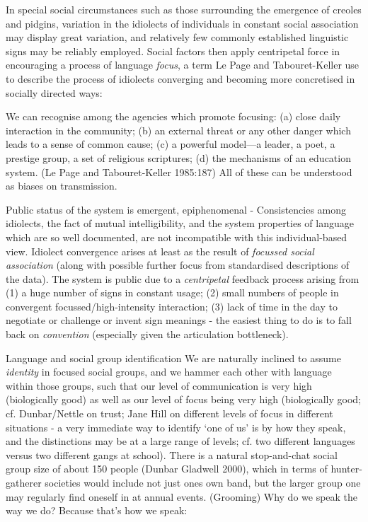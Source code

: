In special social circumstances such as those surrounding the emergence of creoles and pidgins, variation in the idiolects of individuals in constant social association may display great variation, and relatively few commonly established linguistic signs may be reliably employed. Social factors then apply centripetal force in encouraging a process of language \textit{focus}, a term Le Page and Tabouret-Keller use to describe the process of idiolects converging and becoming more concretised in socially directed ways:

We can recognise among the agencies which promote focusing: (a) close daily interaction in the community; (b) an external threat or any other danger which leads to a sense of common cause; (c) a powerful model---a leader, a poet, a prestige group, a set of religious scriptures; (d) the mechanisms of an education system. (Le Page and Tabouret-Keller 1985:187) All of these can be understood as biases on transmission.

Public status of the system is emergent, epiphenomenal - Consistencies among idiolects, the fact of mutual intelligibility, and the system properties of language which are so well documented, are not incompatible with this individual-based view. Idiolect convergence arises at least as the result of \textit{focussed social association} (along with possible further focus from standardised descriptions of the data). The system is public due to a \textit{centripetal} feedback process arising from (1) a huge number of signs in constant usage; (2) small numbers of people in convergent focussed/high-intensity interaction; (3) lack of time in the day to negotiate or challenge or invent sign meanings - the easiest thing to do is to fall back on \textit{convention} (especially given the articulation bottleneck).

Language and social group identification
We are naturally inclined to assume \textit{identity }in focused social groups, and we hammer each other with language within those groups, such that our level of communication is very high (biologically good) as well as our level of focus being very high (biologically good; cf. Dunbar/Nettle on trust; Jane Hill on different levels of focus in different situations - a very immediate way to identify \textquoteleft one of us' is by how they speak, and the distinctions may be at a large range of levels; cf. two different languages versus two different gangs at school). There is a natural stop-and-chat social group size of about 150 people (Dunbar Gladwell 2000), which in terms of hunter-gatherer societies would include not just ones own band, but the larger group one may regularly find oneself in at annual events. (Grooming)
	Why do we speak the way we do? Because that's how we speak:

